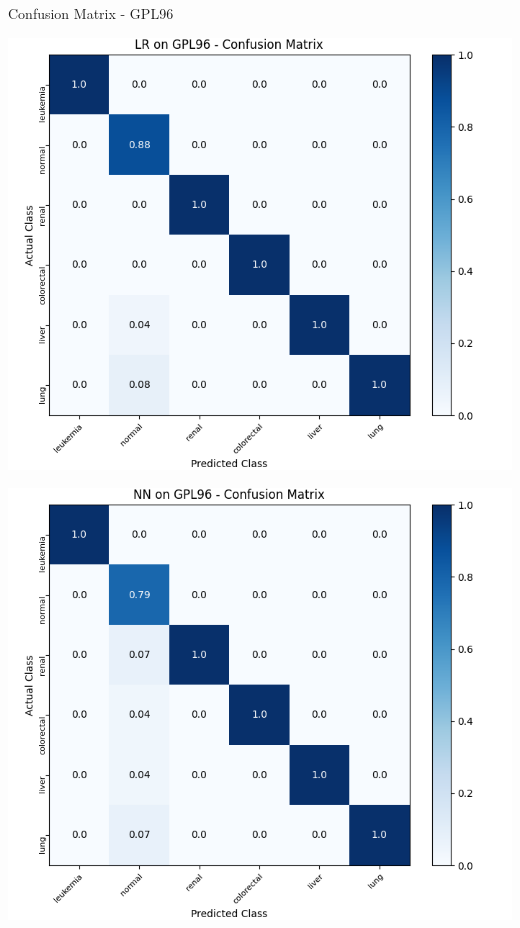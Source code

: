 \documentclass{beamer}
\begin{document}
    \begin{frame}{Confusion Matrix - GPL96}
        \begin{center}
            \hspace{-60pt}
            \begin{minipage}{0.4\textwidth}
                \includegraphics[scale=.40]{LRonGPL96Confusion.png}
            \end{minipage}
            \hspace{30pt}
            \begin{minipage}{0.4\textwidth}
                \includegraphics[scale=.40]{NNonGPL96Confusion.png}
            \end{minipage}
        \end{center}
    \end{frame}
\end{document}
